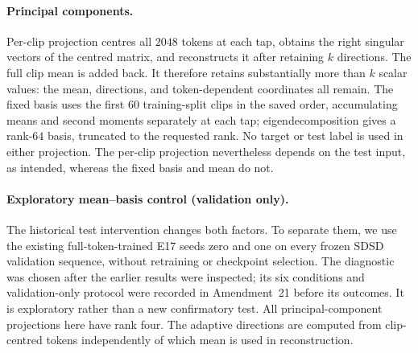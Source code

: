 \paragraph{Principal components.}
Per-clip projection centres all $2048$ tokens at each tap, obtains the right
singular vectors of the centred matrix, and reconstructs it after retaining
$k$ directions. The full clip mean is added back.
It therefore retains substantially more than $k$ scalar values: the mean,
directions, and token-dependent coordinates all remain.
The fixed basis uses the first $60$ training-split clips in the saved order,
accumulating means and second moments separately at each tap; eigendecomposition
gives a rank-$64$ basis, truncated to the requested rank.
No target or test label is used in either projection.
The per-clip projection nevertheless depends on the test input, as intended,
whereas the fixed basis and mean do not.

\paragraph{Exploratory mean--basis control (validation only).}\label{app:meanbasis}
The historical test intervention changes both factors.
To separate them, we use the existing full-token-trained E17 seeds zero and
one on every frozen SDSD validation sequence, without retraining or checkpoint
selection. The diagnostic was chosen after the earlier results were inspected;
its six conditions and validation-only protocol were recorded in Amendment~21
before its outcomes. It is exploratory rather than a new confirmatory test.
All principal-component projections here have rank four.
The adaptive directions are computed from clip-centred tokens independently
of which mean is used in reconstruction.

